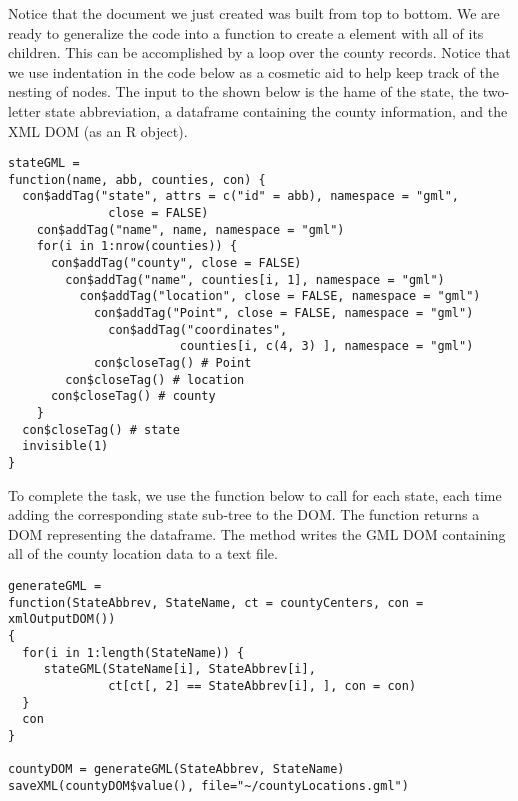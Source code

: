 Notice that the document we just created was built from
top to bottom.
We are ready to generalize the code into a function 
to create a  element with all of its
 children. 
This can be accomplished by a loop over the county records.
Notice that we use indentation in the code below as a cosmetic
aid to help keep track of the nesting of nodes. 
The input to the  shown below is the
hame of the state, the two-letter state abbreviation, 
a dataframe containing the county information, and the
XML DOM (as an R object).


\small{
\begin{verbatim}
stateGML =
function(name, abb, counties, con) {
  con$addTag("state", attrs = c("id" = abb), namespace = "gml", 
              close = FALSE)
    con$addTag("name", name, namespace = "gml")
    for(i in 1:nrow(counties)) {
      con$addTag("county", close = FALSE)
        con$addTag("name", counties[i, 1], namespace = "gml")
          con$addTag("location", close = FALSE, namespace = "gml")
            con$addTag("Point", close = FALSE, namespace = "gml")
              con$addTag("coordinates", 
                        counties[i, c(4, 3) ], namespace = "gml")
            con$closeTag() # Point
        con$closeTag() # location
      con$closeTag() # county
    }
  con$closeTag() # state
  invisible(1)
}
\end{verbatim}
}

To complete the task, we use the  function
below to call  for each state, each time
adding the corresponding state sub-tree to the DOM.
The  function returns a DOM representing the
dataframe. 
The method  writes the GML DOM containing
all of the county location data to a text file.

\small{
\begin{verbatim}
generateGML = 
function(StateAbbrev, StateName, ct = countyCenters, con = xmlOutputDOM())
{
  for(i in 1:length(StateName)) {
     stateGML(StateName[i], StateAbbrev[i], 
              ct[ct[, 2] == StateAbbrev[i], ], con = con)
  }
  con
}

countyDOM = generateGML(StateAbbrev, StateName)
saveXML(countyDOM$value(), file="~/countyLocations.gml")
\end{verbatim}
}
